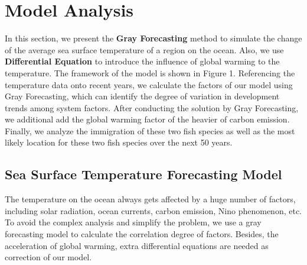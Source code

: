\documentclass{mcmthesis}
\begin{document}
\section{Model Analysis} \label{S4}
		In this section, we present the \textbf{Gray Forecasting} method to simulate the change of the average sea surface temperature of a region on the ocean. Also, we use \textbf{Differential Equation} to introduce the influence of global warming to the temperature. The framework of the model is shown in Figure 1. Referencing the temperature data onto recent years, we calculate the factors of our model using Gray Forecasting, which can identify the degree of variation in development trends among system factors. After conducting the solution by Gray Forecasting, we additional add the global warming factor of the heavier of carbon emission. Finally, we analyze the immigration of these two fish species as well as the most likely location for these two fish species over the next 50 years.

\subsection{Sea Surface Temperature Forecasting Model}\label{S4s1}
	The temperature on the ocean always gets affected by a huge number of factors, including solar radiation, ocean currents, carbon emission, Nino phenomenon, etc. To avoid the complex analysis and simplify the problem, we use a gray forecasting model to calculate the correlation degree of factors. Besides, the acceleration of global warming, extra differential equations are needed as correction of our model.
\end{document}
